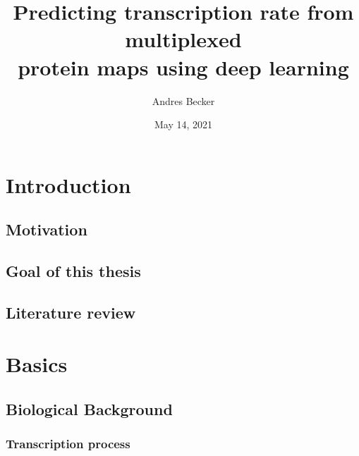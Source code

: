 \documentclass[biblatexBackend=bibtex]{tumthesis}
\author{Andres Becker}
\title{Predicting transcription rate from multiplexed\\protein maps using deep learning}
\institute{Chair of Mathematical Modeling of Biological Systems}
\date{May 14, 2021} %
\begin{document}
\pagestyle{empty}
\frontmatter%
\maketitlepage%





\tableofcontents%

\mainmatter%
\pagestyle{headings}

\chapter{Introduction}
\label{ch:introduction}

\section{Motivation}
\label{sec:intro:motivation}


\section{Goal of this thesis}
\label{sec:intro:goals}


\section{Literature review}
\label{ch:literature_review}




\chapter{Basics}
\label{ch:basics}


\section{Biological Background}
\label{sec:basics:bio_back}

\subsection{Transcription process}
\label{sec:basics:transcription_process}

\end{document}
